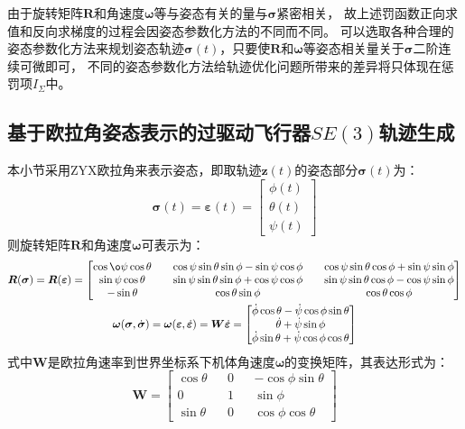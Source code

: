 由于旋转矩阵$\bm{R}$和角速度$\bm{\omega}$等与姿态有关的量与$\bm{\sigma}$紧密相关，
故上述罚函数正向求值和反向求梯度的过程会因姿态参数化方法的不同而不同。
可以选取各种合理的姿态参数化方法来规划姿态轨迹$\bm{\sigma}(t)$，只要使$\bm{R}$和$\bm{\omega}$等姿态相关量关于$\bm{\sigma}$二阶连续可微即可，
不同的姿态参数化方法给轨迹优化问题所带来的差异将只体现在惩罚项$I_\Sigma$中。

\subsection{基于欧拉角姿态表示的过驱动飞行器$SE(3)$轨迹生成}\label{subsec:planning_based_on_euler_angle}
本小节采用ZYX欧拉角来表示姿态，即取轨迹$\bm{z}(t)$的姿态部分$\bm{\sigma}(t)$为：
\begin{equation}
  \bm{\sigma}(t) = \bm{\varepsilon}(t) = 
  \begin{bmatrix}
    \phi(t) \\ \theta(t) \\ \psi(t)
  \end{bmatrix}
\end{equation}
则旋转矩阵$\bm{R}$和角速度$\bm{\omega}$可表示为： 
\begin{gather}
  \bm{R}(\bm{\sigma}) = \bm{R}(\bm{\varepsilon}) = 
  \begin{bmatrix}
    \cos\o\psi\cos\theta & & \cos\psi\sin\theta\sin\phi - \sin\psi\cos\phi & & \cos\psi\sin\theta\cos\phi + \sin\psi\sin\phi \\
    \sin\psi\cos\theta & & \sin\psi\sin\theta\sin\phi + \cos\psi\cos\phi & & \sin\psi\sin\theta\cos\phi - \cos\psi\sin\phi \\
    -\sin\theta & & \cos\theta\sin\phi & & \cos\theta\cos\phi
  \end{bmatrix} \label{equ:euler_angle_to_R}\\
  \bm{\omega}(\bm{\sigma}, \dot{\bm{\sigma}}) = \bm{\omega}(\bm{\varepsilon}, \dot{\bm{\varepsilon}}) = 
  \bm{W}\dot{\bm{\varepsilon}} = 
  \begin{bmatrix}
    \dot{\phi}\cos\theta - \dot{\psi}\cos\phi\sin\theta \\ 
    \dot{\theta} + \dot{\psi}\sin\phi \\ 
    \dot{\phi}\sin\theta + \dot{\psi}\cos\phi\cos\theta
  \end{bmatrix} \label{equ:euler_angle_to_omega}
\end{gather}
式中$\bm{W}$是欧拉角速率到世界坐标系下机体角速度$\bm{\omega}$的变换矩阵，其表达形式为：
\begin{equation}
  \bm{W} = 
  \begin{bmatrix}
    \cos\theta & & 0 & & -\cos\phi\sin\theta \\ 
    0 & & 1 & & \sin\phi \\
    \sin\theta & & 0 & & \cos\phi\cos\theta
  \end{bmatrix}
  \label{equ:W}
\end{equation}

